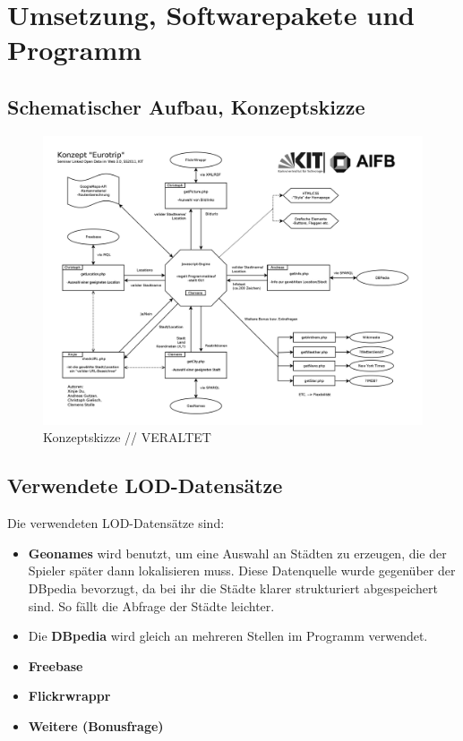 \documentclass[a4paper, 11pt]{article}
\begin{document}
\section{Umsetzung, Softwarepakete und Programm}
\subsection{Schematischer Aufbau, Konzeptskizze}
\begin{figure}[H]
	\centering
	\includegraphics[width=1.0\columnwidth, angle=0]{seminarLOD.png}
	\caption{Konzeptskizze // VERALTET}
	\label{img:grafik-dummy}
\end{figure}
\subsection{Verwendete LOD-Datensätze}
Die verwendeten LOD-Datensätze sind:
\begin{itemize}
\item \textbf{Geonames} wird benutzt, um eine Auswahl an Städten zu erzeugen, die der Spieler später dann lokalisieren muss. Diese Datenquelle wurde gegenüber der DBpedia bevorzugt, da bei ihr die Städte klarer strukturiert abgespeichert sind. So fällt die Abfrage der Städte leichter.
\item Die \textbf{DBpedia} wird gleich an mehreren Stellen im Programm verwendet.
\item \textbf{Freebase}
\item \textbf{Flickrwrappr}
\item \textbf{Weitere (Bonusfrage)}
\end{itemize}
\end{document}
